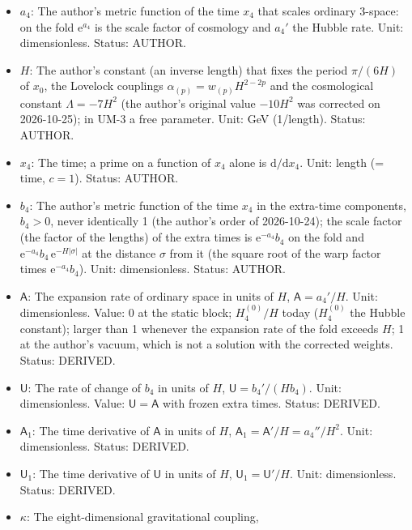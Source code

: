\documentclass[
  10pt,
]{article}
\providecommand{\tightlist}{%
  \setlength{\itemsep}{0pt}\setlength{\parskip}{0pt}}
\begin{document}
\begin{itemize}
\tightlist
\item
  \(a_4\): The author's metric function of the time \(x_4\) that scales
  ordinary 3-space: on the fold \(\mathrm{e}^{a_4}\) is the scale factor
  of cosmology and \(a_4'\) the Hubble rate. Unit: dimensionless.
  Status: AUTHOR.
\item
  \(H\): The author's constant (an inverse length) that fixes the period
  \(\pi/(6H)\) of \(x_0\), the Lovelock couplings
  \(\alpha_{(p)} = w_{(p)}H^{2-2p}\) and the cosmological constant
  \(\Lambda = -7H^2\) (the author's original value \(-10H^2\) was
  corrected on 2026-10-25); in UM-3 a free parameter. Unit: GeV
  (1/length). Status: AUTHOR.
\item
  \(x_4\): The time; a prime on a function of \(x_4\) alone is
  \(\mathrm{d}/\mathrm{d}x_4\). Unit: length (= time, \(c = 1\)).
  Status: AUTHOR.
\item
  \(b_4\): The author's metric function of the time \(x_4\) in the
  extra-time components, \(b_4 > 0\), never identically 1 (the author's
  order of 2026-10-24); the scale factor (the factor of the lengths) of
  the extra times is \(\mathrm{e}^{-a_4}b_4\) on the fold and
  \(\mathrm{e}^{-a_4}b_4\,\mathrm{e}^{-H\lvert\sigma\rvert}\) at the
  distance \(\sigma\) from it (the square root of the warp factor times
  \(\mathrm{e}^{-a_4}b_4\)). Unit: dimensionless. Status: AUTHOR.
\item
  \(\mathsf{A}\): The expansion rate of ordinary space in units of
  \(H\), \(\mathsf{A} = a_4'/H\). Unit: dimensionless. Value: 0 at the
  static block; \(H_4^{(0)}/H\) today (\(H_4^{(0)}\) the Hubble
  constant); larger than 1 whenever the expansion rate of the fold
  exceeds \(H\); 1 at the author's vacuum, which is not a solution with
  the corrected weights. Status: DERIVED.
\item
  \(\mathsf{U}\): The rate of change of \(b_4\) in units of \(H\),
  \(\mathsf{U} = b_4'/(Hb_4)\). Unit: dimensionless. Value:
  \(\mathsf{U} = \mathsf{A}\) with frozen extra times. Status: DERIVED.
\item
  \(\mathsf{A}_1\): The time derivative of \(\mathsf{A}\) in units of
  \(H\), \(\mathsf{A}_1 = \mathsf{A}'/H = a_4''/H^2\). Unit:
  dimensionless. Status: DERIVED.
\item
  \(\mathsf{U}_1\): The time derivative of \(\mathsf{U}\) in units of
  \(H\), \(\mathsf{U}_1 = \mathsf{U}'/H\). Unit: dimensionless. Status:
  DERIVED.
\item
  \(\kappa\): The eight-dimensional gravitational coupling,

\end{itemize}
\end{document}

